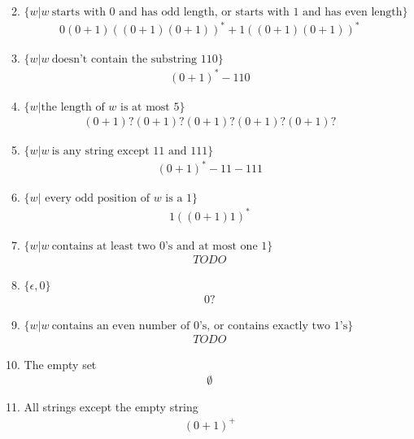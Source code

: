 \begin{enumerate}
\begin{enumerate}
\begin{align*}
                    \end{align*}
              \item $\{w|w~ \text{starts with }0\text{ and has odd length, or starts with }1\text{ and has even length}\}$
                    \begin{align*}
                        0(0+1)((0+1)(0+1))^* + 1((0+1)(0+1))^*
                    \end{align*}
              \item $\{w|w~ \text{doesn't contain the substring }110\}$
                    \begin{align*}
                        (0+1)^*- 110
                    \end{align*}
              \item $\{w|\text{the length of }w\text{ is at most }5\}$
                    \begin{align*}
                        (0+1)?(0+1)?(0+1)?(0+1)?(0+1)?
                    \end{align*}
              \item $\{w|w~ \text{is any string except }11\text{ and }111\}$
                    \begin{align*}
                        (0+1)^* - 11 - 111
                    \end{align*}
              \item $\{w|\text{ every odd position of }w\text{ is a }1\}$
                    \begin{align*}
                        1((0+1)1)^*
                    \end{align*}
              \item $\{w|w~ \text{contains at least two }0\text{'s and at most one }1\}$
                    \begin{align*}
                        TODO
                    \end{align*}
              \item $\{\epsilon,0\}$
                    \begin{align*}
                        0?
                    \end{align*}
              \item $\{w|w~ \text{contains an even number of }0\text{'s, or contains exactly two }1\text{'s}\}$
                    \begin{align*}
                        TODO
                    \end{align*}
              \item The empty set
                    \begin{align*}
                        \emptyset
                    \end{align*}
              \item All strings except the empty string
                    \begin{align*}
                        (0+1)^+
                    \end{align*}
          \end{enumerate}
\end{enumerate}
